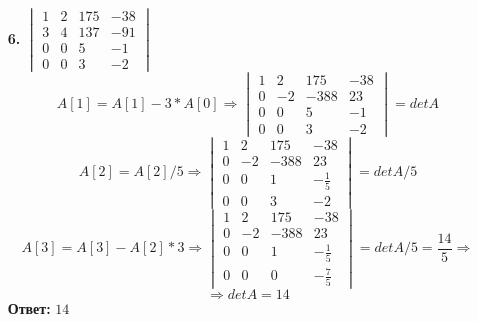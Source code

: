 \documentclass[a4paper]{article}
\renewcommand{\det}[1]{\begin{vmatrix} #1 \end{vmatrix}}
\renewcommand{\f}[2]{\frac{#1}{#2}}
\renewcommand{\r}{\Rightarrow}
\begin{document}
\begin{enumerate}
    \item[\textbf{6.}]$\det{1 & 2 & 175 & -38\\ 3 & 4 & 137 & -91\\ 0 & 0 & 5 & -1 \\ 0 & 0 & 3 & -2}$
    $$A[1] = A[1]-3*A[0] \r \det{1 & 2 & 175 & -38 \\ 0 & -2 & -388 & 23 \\ 0 & 0 & 5 & -1 \\ 0 & 0 & 3 & -2} = detA$$
    $$A[2] = A[2]/5 \r \det{1 & 2 & 175 & -38 \\ 0 & -2 & -388 & 23 \\ 0 & 0 & 1 & -\frac{1}{5} \\ 0 & 0 & 3 & -2} =detA/5$$
    $$A[3] = A[3]-A[2]*3 \r \det{1 & 2 & 175 & -38 \\ 0 & -2 & -388 & 23 \\ 0 & 0 & 1 & -\frac{1}{5} \\ 0 & 0 & 0 & -\frac{7}{5}}=detA/5 = \f{14}{5} \r $$
    $$\r detA = 14$$
    \textbf{Ответ:} $14$


\end{enumerate}
\end{document}
